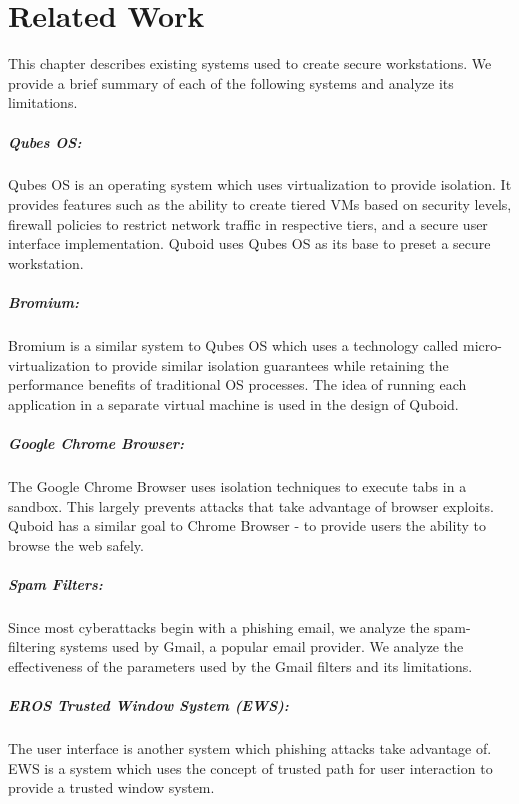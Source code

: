 \chapter{Related Work} \label{chap:relatedwork}

This chapter describes existing systems used to create secure workstations. We provide a brief summary of each of the following systems and analyze its limitations.

\paragraph{Qubes OS:} Qubes OS is an operating system which uses virtualization to provide isolation. It provides features such as the ability to create tiered VMs based on security levels, firewall policies to restrict network traffic in respective tiers, and a secure user interface implementation. Quboid uses Qubes OS as its base to preset a secure workstation.

\paragraph{Bromium:} Bromium is a similar system to Qubes OS which uses a technology called micro-virtualization to provide similar isolation guarantees while retaining the performance benefits of traditional OS processes. The idea of running each application in a separate virtual machine is used in the design of Quboid.

\paragraph{Google Chrome Browser:} The Google Chrome Browser uses isolation techniques to execute tabs in a sandbox. This largely prevents attacks that take advantage of browser exploits. Quboid has a similar goal to Chrome Browser - to provide users the ability to browse the web safely.

\paragraph{Spam Filters:} Since most cyberattacks begin with a phishing email, we analyze the spam-filtering systems used by Gmail, a popular email provider. We analyze the effectiveness of the parameters used by the Gmail filters and its limitations.

\paragraph{EROS Trusted Window System (EWS):} The user interface is another system which phishing attacks take advantage of. EWS is a system which uses the concept of trusted path for user interaction to provide a trusted window system.


